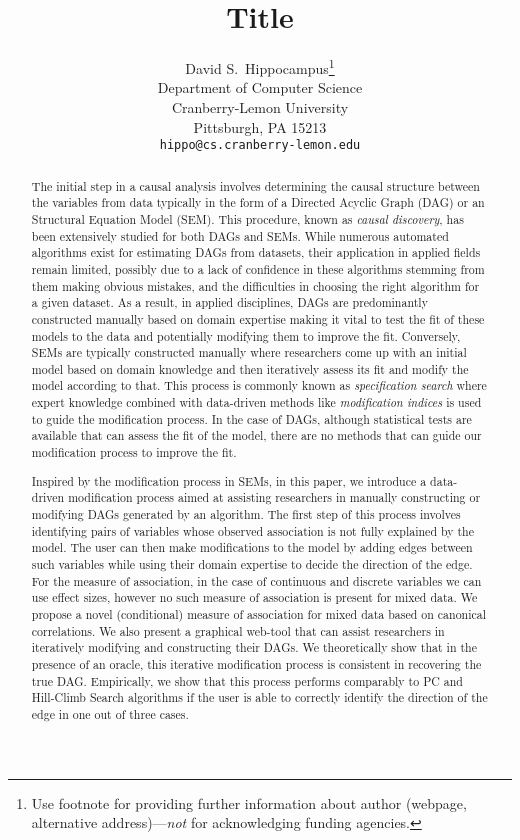 \documentclass{article}
\title{Title}
\author{%
  David S.~Hippocampus\thanks{Use footnote for providing further information
    about author (webpage, alternative address)---\emph{not} for acknowledging
    funding agencies.} \\
  Department of Computer Science\\
  Cranberry-Lemon University\\
  Pittsburgh, PA 15213 \\
  \texttt{hippo@cs.cranberry-lemon.edu} \\
}
\begin{document}
\maketitle

\begin{abstract}
	The initial step in a causal analysis involves determining the causal
	structure between the variables from data typically in the form of a
	Directed Acyclic Graph (DAG) or an Structural Equation Model (SEM).
	This procedure, known as \emph{causal discovery}, has been extensively
	studied for both DAGs and SEMs. While numerous automated algorithms
	exist for estimating DAGs from datasets, their application in applied
	fields remain limited, possibly due to a lack of confidence in these
	algorithms stemming from them making obvious mistakes, and the
	difficulties in choosing the right algorithm for a given dataset. As a
	result, in applied disciplines, DAGs are predominantly constructed
	manually based on domain expertise making it vital to test the fit of
	these models to the data and potentially modifying them to improve the
	fit. Conversely, SEMs are typically constructed manually where
	researchers come up with an initial model based on domain knowledge and
	then iteratively assess its fit and modify the model according to that.
	This process is commonly known as \emph{specification search} where
	expert knowledge combined with data-driven methods like
	\emph{modification indices} is used to guide the modification process.
	In the case of DAGs, although statistical tests are available that can
	assess the fit of the model, there are no methods that can guide our
	modification process to improve the fit.

	Inspired by the modification process in SEMs, in this paper, we
	introduce a data-driven modification process aimed at assisting
	researchers in manually constructing or modifying DAGs generated by an
	algorithm. The first step of this process involves identifying pairs of
	variables whose observed association is not fully explained by the
	model. The user can then make modifications to the model by adding
	edges between such variables while using their domain expertise to
	decide the direction of the edge. For the measure of association, in
	the case of continuous and discrete variables we can use effect sizes,
	however no such measure of association is present for mixed data. We
	propose a novel (conditional) measure of association for mixed data
	based on canonical correlations. We also present a graphical web-tool
	that can assist researchers in iteratively modifying and constructing
	their DAGs. We theoretically show that in the presence of an oracle,
	this iterative modification process is consistent in recovering the
	true DAG. Empirically, we show that this process performs comparably to
	PC and Hill-Climb Search algorithms if the user is able to correctly
	identify the direction of the edge in one out of three cases.
\end{abstract}
\end{document}
